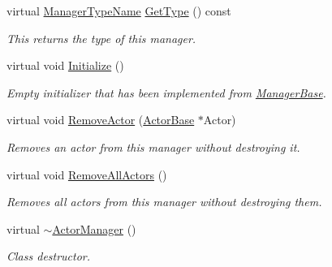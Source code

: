 \begin{DoxyCompactItemize}
virtual \hyperlink{classMezzanine_1_1ManagerBase_a08cecf5169cad3e82be81a3a159b0b6e}{ManagerTypeName} \hyperlink{classMezzanine_1_1ActorManager_abfd167e1e15f32dffed05a2bd1b4ac70}{GetType} () const 
\begin{DoxyCompactList}\small\item\em This returns the type of this manager. \item\end{DoxyCompactList}\item 
\hypertarget{classMezzanine_1_1ActorManager_a3b5b383066473d09243d13ad702c4868}{
virtual void \hyperlink{classMezzanine_1_1ActorManager_a3b5b383066473d09243d13ad702c4868}{Initialize} ()}
\label{classMezzanine_1_1ActorManager_a3b5b383066473d09243d13ad702c4868}

\begin{DoxyCompactList}\small\item\em Empty initializer that has been implemented from \hyperlink{classMezzanine_1_1ManagerBase}{ManagerBase}. \item\end{DoxyCompactList}\item 
virtual void \hyperlink{classMezzanine_1_1ActorManager_ada396c5f6299152348b2fdb00e476361}{RemoveActor} (\hyperlink{classMezzanine_1_1ActorBase}{ActorBase} $\ast$Actor)
\begin{DoxyCompactList}\small\item\em Removes an actor from this manager without destroying it. \item\end{DoxyCompactList}\item 
\hypertarget{classMezzanine_1_1ActorManager_a6ca8342617fa221b0548ff9bc6bf4477}{
virtual void \hyperlink{classMezzanine_1_1ActorManager_a6ca8342617fa221b0548ff9bc6bf4477}{RemoveAllActors} ()}
\label{classMezzanine_1_1ActorManager_a6ca8342617fa221b0548ff9bc6bf4477}

\begin{DoxyCompactList}\small\item\em Removes all actors from this manager without destroying them. \item\end{DoxyCompactList}\item 
\hypertarget{classMezzanine_1_1ActorManager_acb09f9f1b4766dd2ca9e645bb505ac2f}{
virtual \hyperlink{classMezzanine_1_1ActorManager_acb09f9f1b4766dd2ca9e645bb505ac2f}{$\sim$ActorManager} ()}
\label{classMezzanine_1_1ActorManager_acb09f9f1b4766dd2ca9e645bb505ac2f}

\begin{DoxyCompactList}\small\item\em Class destructor. \item\end{DoxyCompactList}\end{DoxyCompactItemize}
